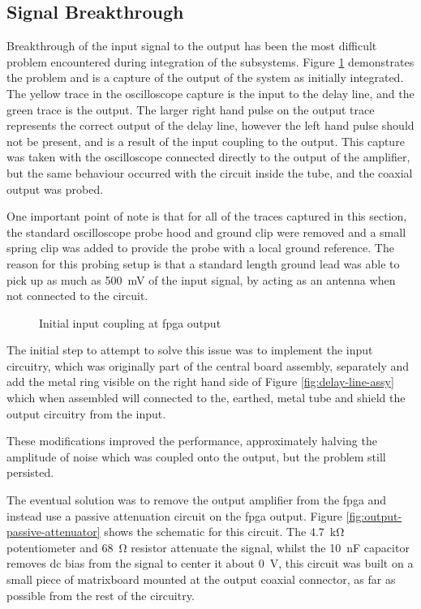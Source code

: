 \subsection{Signal Breakthrough} \label{sec:signal-breakthrough}
Breakthrough of the input signal to the output has been the most difficult problem encountered during integration of the subsystems. Figure \ref{fig:fpga-initial-input-couping} demonstrates the problem and is a capture of the output of the system as initially integrated. The yellow trace in the oscilloscope capture is the input to the delay line, and the green trace is the output. The larger right hand pulse on the output trace represents the correct output of the delay line, however the left hand pulse should not be present, and is a result of the input coupling to the output. This capture was taken with the oscilloscope connected directly to the output of the amplifier, but the same behaviour occurred with the circuit inside the tube, and the coaxial output was probed.

One important point of note is that for all of the traces captured in this section, the standard oscilloscope probe hood and ground clip were removed and a small spring clip was added to provide the probe with a local ground reference. The reason for this probing setup is that a standard length ground lead was able to pick up as much as \SI{500}{\milli\volt} of the input signal, by acting as an antenna when not connected to the circuit.

\begin{figure}[ht]
	\centering
	\caption{Initial input coupling at \gls{fpga} output}
	\label{fig:fpga-initial-input-couping}
\end{figure}

The initial step to attempt to solve this issue was to implement the input circuitry, which was originally part of the central board assembly, separately and add the metal ring visible on the right hand side of Figure \ref{fig:delay-line-assy} which when assembled will connected to the, earthed, metal tube and shield the output circuitry from the input.

These modifications improved the performance, approximately halving the amplitude of noise which was coupled onto the output, but the problem still persisted.

The eventual solution was to remove the output amplifier from the \gls{fpga} and instead use a passive attenuation circuit on the \gls{fpga} output. Figure \ref{fig:output-passive-attenuator} shows the schematic for this circuit. The \SI{4.7}{\kilo\ohm} potentiometer and \SI{68}{\ohm} resistor attenuate the signal, whilst the \SI{10}{\nano\farad} capacitor removes \gls{dc} bias from the signal to center it about \SI{0}{\volt}, this circuit was built on a small piece of matrixboard mounted at the output coaxial connector, as far as possible from the rest of the circuitry.

